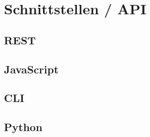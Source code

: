 
\section{Schnittstellen / API}

\subsection{REST}

\subsection{JavaScript}

\subsection{CLI}

\subsection{Python}

